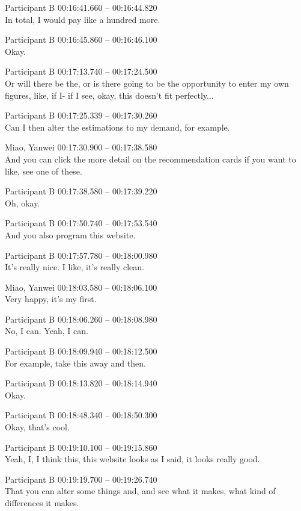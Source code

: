 {Participant B 00:16:41.660 -- 00:16:44.820 \\
In total, I would pay like a hundred more.

Participant B 00:16:45.860 -- 00:16:46.100 \\
Okay.

Participant B 00:17:13.740 -- 00:17:24.500 \\
Or will there be the, or is there going to be the opportunity to enter my own figures, like, if I- if I see, okay, this doesn't fit perfectly...

Participant B 00:17:25.339 -- 00:17:30.260 \\
Can I then alter the estimations to my demand, for example.

Miao, Yanwei 00:17:30.900 -- 00:17:38.580 \\
And you can click the more detail on the recommendation cards if you want to like, see one of these.

Participant B 00:17:38.580 -- 00:17:39.220 \\
Oh, okay.

Participant B 00:17:50.740 -- 00:17:53.540 \\
And you also program this website.

Participant B 00:17:57.780 -- 00:18:00.980 \\
It's really nice. I like, it's really clean.

Miao, Yanwei 00:18:03.580 -- 00:18:06.100 \\
Very happy, it's my first.

Participant B 00:18:06.260 -- 00:18:08.980 \\
No, I can. Yeah, I can.

Participant B 00:18:09.940 -- 00:18:12.500 \\
For example, take this away and then.

Participant B 00:18:13.820 -- 00:18:14.940 \\
Okay.

Participant B 00:18:48.340 -- 00:18:50.300 \\
Okay, that's cool.

Participant B 00:19:10.100 -- 00:19:15.860 \\
Yeah, I, I think this, this website looks as I said, it looks really good.

Participant B 00:19:19.700 -- 00:19:26.740 \\
That you can alter some things and, and see what it makes, what kind of differences it makes.

}
